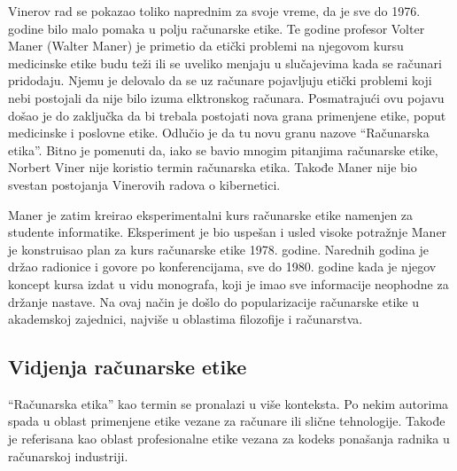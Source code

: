 \documentclass[a4paper]{article}
\begin{document}
Vinerov rad se pokazao toliko naprednim za svoje vreme, da je sve do 1976. godine bilo malo pomaka u polju računarske etike. Te godine profesor Volter Maner (Walter Maner) je primetio da etički problemi na njegovom kursu medicinske etike budu teži ili se uveliko menjaju u slučajevima kada se računari pridodaju. Njemu je delovalo da se uz računare pojavljuju etički problemi koji nebi postojali da nije bilo izuma elktronskog računara. Posmatrajući ovu pojavu došao je do zaključka da bi trebala postojati nova grana primenjene etike, poput medicinske i poslovne etike. Odlučio je da tu novu granu nazove ``Računarska etika''. Bitno je pomenuti da, iako se bavio mnogim pitanjima računarske etike, Norbert Viner nije koristio termin računarska etika. Takođe Maner nije bio svestan postojanja Vinerovih radova o kibernetici.

Maner je zatim kreirao eksperimentalni kurs računarske etike namenjen za studente informatike. Eksperiment je bio uspešan i usled visoke potražnje Maner je konstruisao plan za kurs računarske etike 1978. godine. Narednih godina je držao radionice i govore po konferencijama, sve do 1980. godine kada je njegov koncept kursa izdat u vidu monografa, koji je imao sve informacije neophodne za držanje nastave. Na ovaj način je došlo do popularizacije računarske etike u akademskoj zajednici, najviše u oblastima filozofije i računarstva.



\subsection{Vidjenja računarske etike}

``Računarska etika'' kao termin se pronalazi u više konteksta. Po nekim autorima spada u oblast primenjene etike vezane za računare ili slične tehnologije.
Takođe je referisana kao oblast profesionalne etike vezana za kodeks ponašanja radnika u računarskoj industriji.




\end{document}
